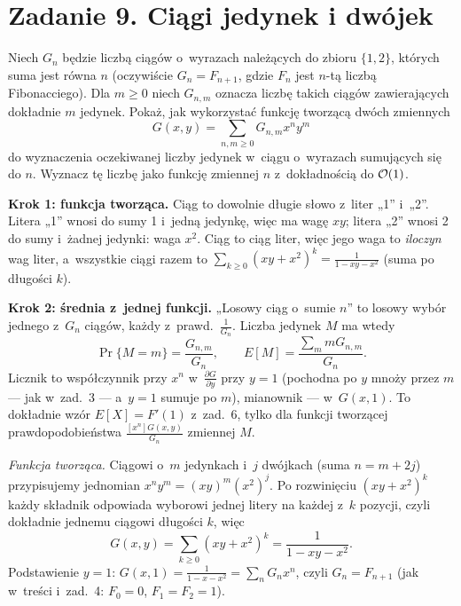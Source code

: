 \documentclass[11pt]{article}
\begin{document}
\section{Zadanie 9. Ciągi jedynek i dwójek}
\begin{tresc}
Niech $G_n$ będzie liczbą ciągów o~wyrazach należących do zbioru $\{1,2\}$,
których suma jest równa $n$ (oczywiście $G_n=F_{n+1}$, gdzie $F_n$ jest
$n$-tą liczbą Fibonacciego). Dla $m\ge0$ niech $G_{n,m}$ oznacza liczbę
takich ciągów zawierających dokładnie $m$ jedynek. Pokaż, jak wykorzystać
funkcję tworzącą dwóch zmiennych
\[
G(x,y)=\sum_{n,m\ge0}G_{n,m}x^ny^m
\]
do wyznaczenia oczekiwanej liczby jedynek w~ciągu o~wyrazach sumujących się
do $n$. Wyznacz tę liczbę jako funkcję zmiennej $n$ z~dokładnością do
$\mathcal{O}(1)$.
\end{tresc}

\begin{intuicja}
\textbf{Krok 1: funkcja tworząca.} Ciąg to dowolnie długie słowo z~liter
„1” i~„2”. Litera „1” wnosi do sumy 1 i~jedną jedynkę, więc ma wagę $xy$;
litera „2” wnosi 2 do sumy i~żadnej jedynki: waga $x^2$. Ciąg to
ciąg liter, więc jego waga to \emph{iloczyn} wag liter, a~wszystkie ciągi
razem to $\sum_{k\ge0}(xy+x^2)^k=\frac1{1-xy-x^2}$ (suma po długości $k$).

\textbf{Krok 2: średnia z~jednej funkcji.} „Losowy ciąg o~sumie $n$” to
losowy wybór jednego z~$G_n$ ciągów, każdy z~prawd.\ $\frac1{G_n}$. Liczba
jedynek $M$ ma wtedy
\[
\Pr\{M=m\}=\frac{G_{n,m}}{G_n},\qquad
E[M]=\frac{\sum_mmG_{n,m}}{G_n}.
\]
Licznik to współczynnik przy $x^n$
w~$\frac{\partial G}{\partial y}$ przy $y=1$ (pochodna po $y$ mnoży przez
$m$ --- jak w~zad.~3 --- a~$y=1$ sumuje po $m$), mianownik --- w~$G(x,1)$.
To dokładnie wzór $E[X]=F'(1)$ z~zad.~6, tylko dla
funkcji tworzącej prawdopodobieństwa $\frac{[x^n]G(x,y)}{G_n}$ zmiennej $M$.
\end{intuicja}

\formalnie
\emph{Funkcja tworząca.} Ciągowi o~$m$ jedynkach i~$j$ dwójkach (suma
$n=m+2j$) przypisujemy jednomian $x^ny^m=(xy)^m(x^2)^j$. Po rozwinięciu
$(xy+x^2)^k$ każdy składnik odpowiada wyborowi jednej litery na każdej
z~$k$ pozycji, czyli dokładnie jednemu ciągowi długości $k$, więc
\[
G(x,y)=\sum_{k\ge0}(xy+x^2)^k=\frac1{1-xy-x^2}.
\]
Podstawienie $y=1$: $G(x,1)=\frac1{1-x-x^2}=\sum_nG_nx^n$, czyli
$G_n=F_{n+1}$ (jak w~treści i~zad.~4: $F_0=0$, $F_1=F_2=1$).
\end{document}
